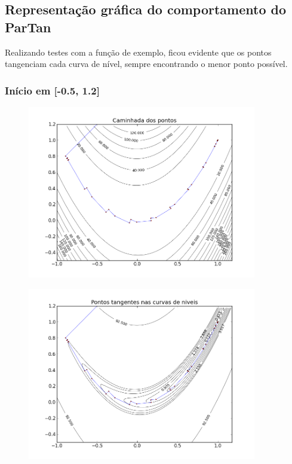 \documentclass[12pt]{article}
\begin{document}
\subsection{Representação gráfica do comportamento do ParTan}
\mbox{}

Realizando testes com a função de exemplo, ficou evidente que os pontos tangenciam cada curva de nível, sempre encontrando o menor ponto possível.

\clearpage
\subsubsection{Início em [-0.5, 1.2]}

\begin{figure}[!h]
\begin{center}
\includegraphics[width=10cm]{0_5_1_2_partan.png}
\end{center}
\end{figure}

\begin{figure}[!h]
\begin{center}
\includegraphics[width=10cm]{0_5_1_2_tangente.png}
\end{center}
\end{figure}
\end{document}
